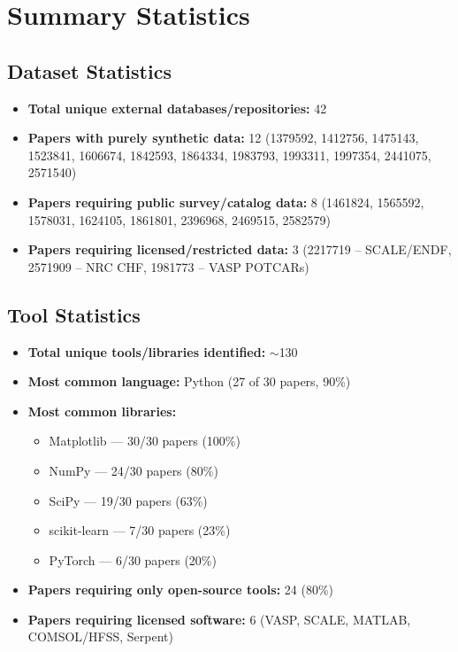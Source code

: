 \documentclass[11pt,a4paper]{article}
\begin{document}
\newpage
\section{Summary Statistics}

\subsection{Dataset Statistics}
\begin{itemize}[nosep]
  \item \textbf{Total unique external databases/repositories:} 42
  \item \textbf{Papers with purely synthetic data:} 12 (1379592, 1412756, 1475143, 1523841, 1606674, 1842593, 1864334, 1983793, 1993311, 1997354, 2441075, 2571540)
  \item \textbf{Papers requiring public survey/catalog data:} 8 (1461824, 1565592, 1578031, 1624105, 1861801, 2396968, 2469515, 2582579)
  \item \textbf{Papers requiring licensed/restricted data:} 3 (2217719 -- SCALE/ENDF, 2571909 -- NRC CHF, 1981773 -- VASP POTCARs)
\end{itemize}

\subsection{Tool Statistics}
\begin{itemize}[nosep]
  \item \textbf{Total unique tools/libraries identified:} $\sim$130
  \item \textbf{Most common language:} Python (27 of 30 papers, 90\%)
  \item \textbf{Most common libraries:}
    \begin{itemize}[nosep]
      \item Matplotlib --- 30/30 papers (100\%)
      \item NumPy --- 24/30 papers (80\%)
      \item SciPy --- 19/30 papers (63\%)
      \item scikit-learn --- 7/30 papers (23\%)
      \item PyTorch --- 6/30 papers (20\%)
    \end{itemize}
  \item \textbf{Papers requiring only open-source tools:} 24 (80\%)
  \item \textbf{Papers requiring licensed software:} 6 (VASP, SCALE, MATLAB, COMSOL/HFSS, Serpent)
\end{itemize}
\end{document}
